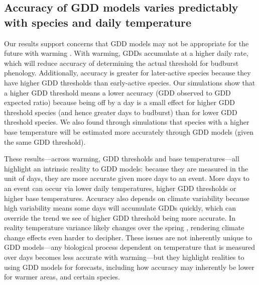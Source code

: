 \documentclass{article}\usepackage[]{graphicx}\usepackage[]{color}
\begin{document}
\subsection*{Accuracy of GDD models varies predictably with species and daily temperature} 
Our results support concerns that GDD models may not be appropriate for the future with warming \citep{Man2010}. With warming, GDDs accumulate at a higher daily rate, which will reduce accuracy of determining the actual threshold for budburst phenology. Additionally, accuracy is greater for later-active species because they have higher GDD thresholds than early-active species. Our simulations show that a higher GDD threshold means a lower accuracy (GDD observed to GDD expected ratio) because being off by a day is a small effect for higher GDD threshold species (and hence greater days to budburst) than for lower GDD threshold species. We also found through simulations that species with a higher base temperature will be estimated more accurately through GDD models (given the same GDD threshold). 

These results---across warming, GDD thresholds and base temperatures---all highlight an intrinsic reality to GDD models: because they are measured in the unit of days, they are more accurate given more days to an event. More days to an event can occur via lower daily temperatures, higher GDD thresholds or higher base temperatures. Accuracy also depends on climate variability because high variability means some days will accumulate GDDs quickly, which can override the trend we see of higher GDD threshold being more accurate. In reality temperature variance likely changes over the spring \citep{Qu2014}, rendering climate change effects even harder to decipher. These issues are not inherently unique to GDD models---any biological process dependent on temperature that is measured over days becomes less accurate with warming---but they highlight realities to using GDD models for forecasts, including how accuracy may inherently be lower for warmer areas, and certain species. 
\end{document}
